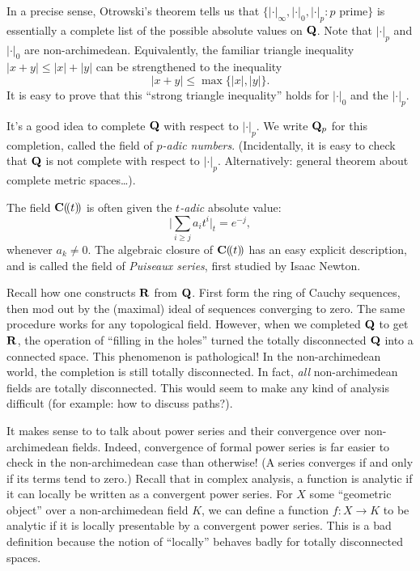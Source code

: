 In a precise sense, Otrowski's theorem tells us that 
$\{|\cdot|_\infty,|\cdot|_0,|\cdot|_p:\text{$p$ prime}\}$ is essentially a 
complete list of the possible absolute values on $\mathbf{Q}$. Note that 
$|\cdot|_p$ and $|\cdot|_0$ are non-archimedean. Equivalently, the familiar 
triangle inequality $|x+y|\leqslant |x|+|y|$ can be strengthened to the 
inequality 
\[
  |x+y| \leqslant \max\{|x|,|y|\} .
\]
It is easy to prove that this ``strong triangle inequality'' holds for 
$|\cdot|_0$ and the $|\cdot|_p$. 

It's a good idea to complete $\mathbf{Q}$ with respect to $|\cdot|_p$. We write 
$\mathbf{Q}_p$ for this completion, called the field of \emph{$p$-adic numbers}. 
(Incidentally, it is easy to check that $\mathbf{Q}$ is not complete with respect 
to $|\cdot|_p$. Alternatively: general theorem about complete metric spaces\ldots). 

\begin{example}
The field $\mathbf{C}(\!( t)\!)$ is often given the \emph{$t$-adic} absolute 
value: 
\[
  \bigg|\sum_{i\geqslant j} a_i t^i\bigg|_t = e^{-j} ,
\]
whenever $a_k\ne 0$. The algebraic closure of $\mathbf{C}(\!( t)\!)$ has an easy 
explicit description, and is called the field of \emph{Puiseaux series}, first 
studied by Isaac Newton. 
\end{example}

Recall how one constructs $\mathbf{R}$ from $\mathbf{Q}$. First form the ring of Cauchy 
sequences, then mod out by the (maximal) ideal of sequences converging to zero. 
The same procedure works for any topological field. However, when we completed 
$\mathbf{Q}$ to get $\mathbf{R}$, the operation of ``filling in the holes'' turned the 
totally disconnected $\mathbf{Q}$ into a connected space. This phenomenon is 
pathological! In the non-archimedean world, the completion is still totally 
disconnected. In fact, \emph{all} non-archimedean fields are totally 
disconnected. This would seem to make any kind of analysis difficult (for 
example: how to discuss paths?). 

It makes sense to to talk about power series and their convergence over 
non-archimedean fields. Indeed, convergence of formal power series is far 
easier to check in the non-archimedean case than otherwise! (A series converges 
if and only if its terms tend to zero.) Recall that in complex analysis, 
a function is analytic if it can locally be written as a convergent power 
series. For $X$ some ``geometric object'' over a non-archimedean field $K$, we 
can define a function $f\colon X\to K$ to be analytic if it is 
locally presentable by a convergent power series. This is a bad definition 
because the notion of ``locally'' behaves badly for totally disconnected 
spaces. 





